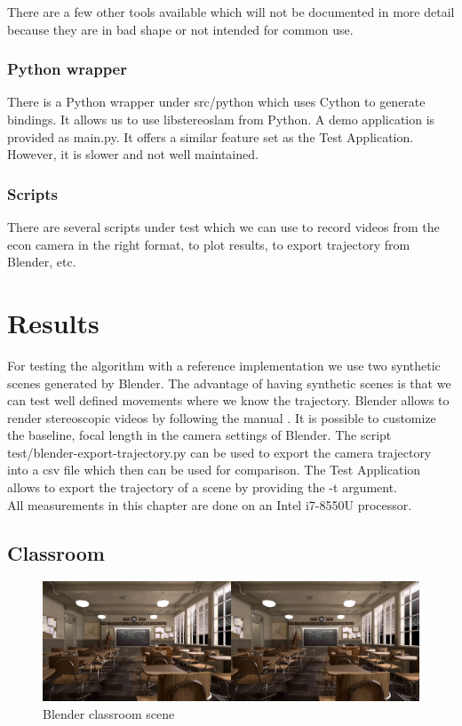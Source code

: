 \documentclass[11pt,a4paper,titlepage,oneside]{report}
\begin{document}
There are a few other tools available which will not be documented in more detail because they are in bad shape or not intended for common use.

\subsection{Python wrapper}
There is a Python wrapper under src/python which uses Cython to generate bindings. It allows us to use libstereoslam from Python. A demo application is provided as main.py. It offers a similar feature set as the Test Application. However, it is slower and not well maintained.

\subsection{Scripts}
There are several scripts under test which we can use to record videos from the econ camera in the right format, to plot results, to export trajectory from Blender, etc.

\chapter{Results}\label{ch:results}

For testing the algorithm with a reference implementation we use two synthetic scenes generated by Blender. The advantage of having synthetic scenes is that we can test well defined movements where we know the trajectory. Blender allows to render stereoscopic videos by following the manual \cite{blender_stereo}. It is possible to customize the baseline, focal length in the camera settings of Blender. The script test/blender-export-trajectory.py can be used to export the camera trajectory into a csv file which then can be used for comparison. The Test Application allows to export the trajectory of a scene by providing the -t argument.\\
All measurements in this chapter are done on an Intel i7-8550U processor.

\section{Classroom}
\begin{figure}[H]
  \includegraphics[width=1.0\textwidth]{img/blender_classroom_scene.png}
  \caption{Blender classroom scene}\label{fig:blender_classroom_scene}
\end{figure}
\end{document}
